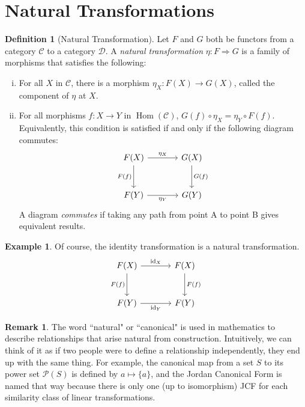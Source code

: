 \documentclass[12pt]{book}
\theoremstyle{definition}
\newtheorem{definition}{Definition}[section]
\newtheorem{defexample}{Example}[definition]
\theoremstyle{plain}
\theoremstyle{definition}
\newtheorem*{remark}{Remark}
\DeclareMathOperator{\id}{id}
\DeclareMathOperator{\Hom}{Hom}
\begin{document}
\section{Natural Transformations}

\begin{definition}[Natural Transformation]
  Let $F$ and $G$ both be functors from a category $\mathscr{C}$ to a category $\mathscr{D}$. A \emph{natural transformation} $\eta : F \Rightarrow G$ is a family of morphisms that satisfies the following:
  \begin{enumerate}[i.]
    \item For all $X$ in $\mathscr{C}$, there is a morphism $\eta_X : F(X) \rightarrow G(X)$, called the component of $\eta$ at $X$.
    \item For all morphisms $f : X \rightarrow Y$ in $\Hom(\mathscr{C})$, $G(f) \circ \eta_X = \eta_Y \circ F(f)$. Equivalently, this condition is satisfied if and only if the following diagram commutes:
    \[\begin{tikzcd}[row sep=large, column sep = large]
      F(X) \arrow{r}{\eta_X} \arrow[swap]{d}{F(f)} & G(X) \arrow{d}{G(f)} \\
      F(Y) \arrow[swap]{r}{\eta_Y} & G(Y)
    \end{tikzcd}\]
    A diagram \emph{commutes} if taking any path from point A to point B gives equivalent results.
  \end{enumerate}
\end{definition}

\begin{defexample}
  Of course, the identity transformation is a natural transformation.
  \[\begin{tikzcd}[row sep=large, column sep = large]
    F(X) \arrow{r}{\id_X} \arrow[swap]{d}{F(f)} & F(X) \arrow{d}{F(f)} \\
    F(Y) \arrow[swap]{r}{\id_Y} & F(Y)
  \end{tikzcd}\]
\end{defexample}

\begin{remark}
  The word ``natural" or ``canonical" is used in mathematics to describe relationships that arise natural from construction. Intuitively, we can think of it as if two people were to define a relationship independently, they end up with the same thing. For example, the canonical map from a set $S$ to its power set $\mathcal{P}(S)$ is defined by $a \mapsto \{a\}$, and the Jordan Canonical Form is named that way because there is only one (up to isomorphism) JCF for each similarity class of linear transformations.
\end{remark}
\end{document}
